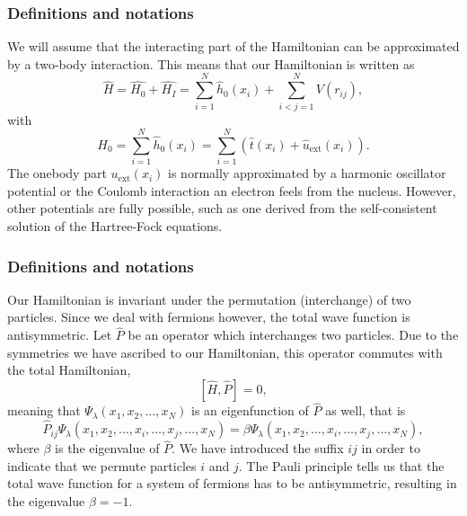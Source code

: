 \documentclass[compress]{beamer}
\begin{document}
\frame
{
  \frametitle{Definitions and notations}
\begin{small}
{\scriptsize
We will assume that the interacting part of the Hamiltonian
can be approximated by a two-body interaction.
This means that our Hamiltonian is written as 
\begin{equation}
    \hat{H} = \hat{H_0} + \hat{H_I} 
    = \sum_{i=1}^N \hat{h}_0(x_i) + \sum_{i<j=1}^N V(r_{ij}),
\label{Hnuclei}
\end{equation}
with 
\begin{equation}
  H_0=\sum_{i=1}^N \hat{h}_0(x_i) =  \sum_{i=1}^N\left(\hat{t}(x_i) + \hat{u}_{\mathrm{ext}}(x_i)\right).
\label{hinuclei}
\end{equation}
The onebody part $u_{\mathrm{ext}}(x_i)$ is normally approximated by a harmonic oscillator potential or the Coulomb interaction an electron feels from the nucleus. However, other potentials are fully possible, such as 
one derived from the self-consistent solution of the Hartree-Fock equations.
}
\end{small}
}

\frame
{
  \frametitle{Definitions and notations}
\begin{small}
{\scriptsize
Our Hamiltonian is invariant under the permutation (interchange) of two particles. %
Since we deal with fermions however, the total wave function is antisymmetric.
Let $\hat{P}$ be an operator which interchanges two particles.
Due to the symmetries we have ascribed to our Hamiltonian, this operator commutes with the total Hamiltonian,
\[
[\hat{H},\hat{P}] = 0,
\]
meaning that $\Psi_{\lambda}(x_1, x_2, \dots , x_N)$ is an eigenfunction of 
$\hat{P}$ as well, that is
\[
\hat{P}_{ij}\Psi_{\lambda}(x_1, x_2, \dots,x_i,\dots,x_j,\dots,x_N)=
\beta\Psi_{\lambda}(x_1, x_2, \dots,x_i,\dots,x_j,\dots,x_N),
\]
where $\beta$ is the eigenvalue of $\hat{P}$. We have introduced the suffix $ij$ in order to indicate that we permute particles $i$ and $j$.
The Pauli principle tells us that the total wave function for a system of fermions
has to be antisymmetric, resulting in the eigenvalue $\beta = -1$.   
}
\end{small}
}
\end{document}
